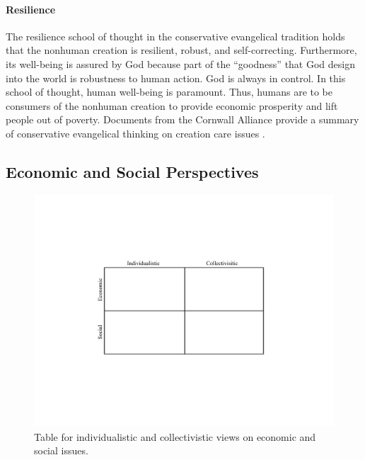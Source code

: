 \documentclass[12pt]{article}
\begin{document}
\paragraph{Resilience} 
\label{sec:resilience}

The resilience school of thought in the conservative evangelical tradition
holds that the nonhuman creation is resilient, robust, and self-correcting.
Furthermore, its well-being is assured by God because part of the ``goodness'' that God design into the world is robustness to human action.
God is always in control.
In this school of thought, human well-being is paramount. 
Thus, humans are to be consumers of the nonhuman creation 
to provide economic prosperity and
lift people out of poverty.
Documents from the Cornwall Alliance 
provide a summary of conservative evangelical thinking on creation care issues
\autocite{Cornwall:2006aa}.


\subsection{Economic and Social Perspectives}
\label{sec:economic_and_social}

\begin{figure}
\centering
\includegraphics[width=0.75\linewidth]{figure_other/QuadTable}
\caption{Table for individualistic and collectivistic views on economic and social issues.}
\label{fig:table}
\end{figure}

\end{document}
